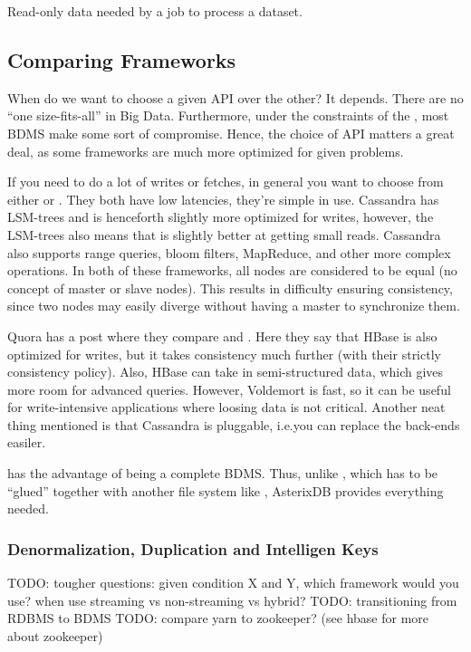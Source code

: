 \begin{definition}\label{def:sidedata}
    Read-only data needed by a job to process a dataset.
\end{definition}

\subsection{Comparing Frameworks}
When do we want to choose a given API over the other? It depends.
There are no ``one size-fits-all'' in Big Data. Furthermore, under the constraints of
the , most BDMS make some sort of compromise. Hence,
the choice of API matters a great deal, as some frameworks are much more optimized
for given problems.

If you need to do a lot of writes or fetches, in general you want to choose from either
 or . They both have low latencies, they're simple in use. Cassandra has LSM-trees and is henceforth slightly more optimized for writes, however, the LSM-trees also means that 
is slightly better at getting small reads. Cassandra also supports range queries, bloom filters, MapReduce, and other more complex operations. In both of these frameworks, all
nodes are considered to be equal (no concept of master or slave nodes). This
results in difficulty ensuring consistency, since two nodes may easily diverge
without having a master to synchronize them.

Quora has a post where they compare  and . 
Here they say that HBase is also optimized for writes, but it takes consistency much further (with their
strictly consistency policy). Also, HBase can take in semi-structured data, which gives
more room for advanced queries. However, Voldemort is fast, so it can be useful
for write-intensive applications where loosing data is not critical. Another neat thing mentioned is that Cassandra is pluggable, i.e.\@ you can replace the 
back-ends easiler.

 has the advantage of being a complete BDMS. Thus, unlike 
, which has to be ``glued'' together with another file system
like , AsterixDB provides everything needed.


\subsubsection{Denormalization, Duplication and Intelligen Keys}\label{sec:DDI}
TODO: tougher questions: given condition X and Y, which framework would you use?
    when use streaming vs non-streaming vs hybrid?
TODO: transitioning from RDBMS to BDMS
TODO:  compare yarn to zookeeper? (see hbase for more about zookeeper)
